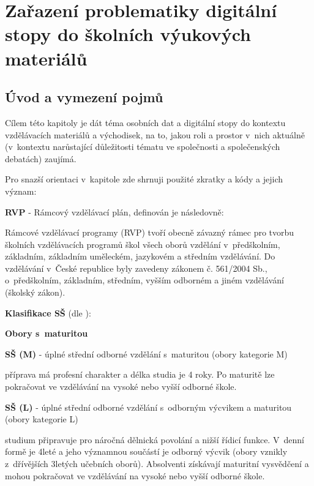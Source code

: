 \chapter{Zařazení problematiky digitální stopy do školních výukových materiálů}

\section{Úvod a vymezení pojmů}

Cílem této kapitoly je dát téma osobních dat a digitální stopy do kontextu vzdělávacích materiálů a východisek, na to, jakou roli a prostor v~nich aktuálně (v~kontextu narůstající důležitosti tématu ve společnosti a společenských debatách) zaujímá. 

Pro snazší orientaci v~kapitole zde shrnuji použité zkratky a kódy a jejich význam:

\textbf{RVP} - Rámcový vzdělávací plán, definován \citep{rvp} je následovně:

\begin{displayquote}
Rámcové vzdělávací programy (RVP) tvoří obecně závazný rámec pro tvorbu školních vzdělávacích programů škol všech oborů vzdělání v~předškolním, základním, základním uměleckém, jazykovém a středním vzdělávání. Do vzdělávání v~České republice byly zavedeny zákonem č. 561/2004 Sb., o~předškolním, základním, středním, vyšším odborném a jiném vzdělávání (školský zákon).
\end{displayquote}

\textbf{Klasifikace SŠ} (dle \citep{stredni-vzdelavani}):

\textbf{Obory s~maturitou}

\textbf{SŠ (M)} - úplné střední odborné vzdělání s~maturitou (obory kategorie M)

\begin{displayquote}
příprava má profesní charakter a délka studia je 4 roky. Po maturitě lze pokračovat ve vzdělávání na vysoké nebo vyšší odborné škole.
\end{displayquote}

\textbf{SŠ (L)} - úplné střední odborné vzdělání s~odborným výcvikem a maturitou (obory kategorie L)

\begin{displayquote}
studium připravuje pro náročná dělnická povolání a nižší řídicí funkce. V~denní formě je 4leté a jeho významnou součástí je odborný výcvik (obory vznikly z~dřívějších 3letých učebních oborů). Absolventi získávají maturitní vysvědčení a mohou pokračovat ve vzdělávání na vysoké nebo vyšší odborné škole.
\end{displayquote}

